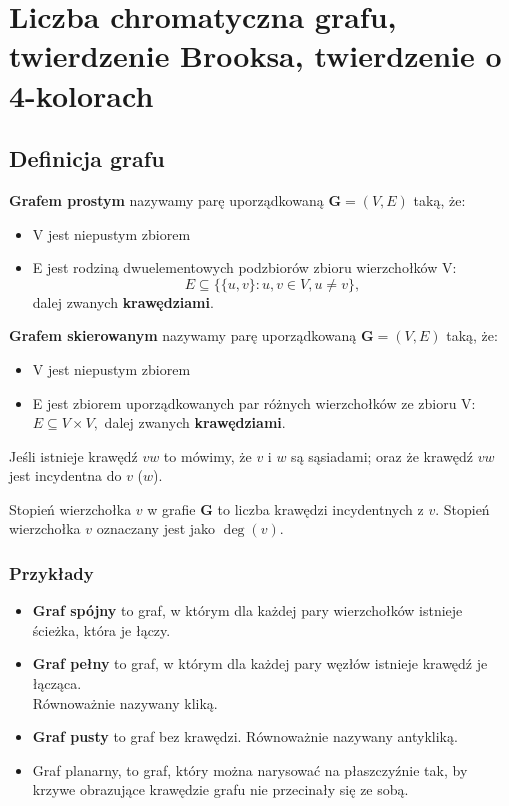\chapter{Liczba chromatyczna grafu, twierdzenie Brooksa, twierdzenie o 4-kolorach}		
\section{Definicja grafu}
	 \begin{df}
	 	\textbf{Grafem prostym} nazywamy parę uporządkowaną $\mathbf{G} = (V,E)$ taką, że:
	 	\begin{itemize}
	 		\item V jest niepustym zbiorem
	 		\item E jest rodziną dwuelementowych podzbiorów zbioru wierzchołków V:
	 		$$E\subseteq \{ \{u,v\} : u,v \in V,u \neq v\},$$
	 		dalej zwanych \textbf{krawędziami}.
	 	\end{itemize}
	 \end{df}
	 \begin{df}
	 	\textbf{Grafem skierowanym} nazywamy parę uporządkowaną $\mathbf{G} = (V,E)$ taką, że:
	 	\begin{itemize}
	 		\item V jest niepustym zbiorem
	 		\item E jest zbiorem uporządkowanych par różnych wierzchołków ze zbioru V: $E\subseteq V \times V,$ dalej zwanych \textbf{krawędziami}.
	 	\end{itemize}
	 \end{df}
	 \begin{df}
	 	Jeśli istnieje krawędź $vw$ to mówimy, że $v$ i  $w$ są sąsiadami; oraz że krawędź $vw$ jest incydentna do $v$ ($w$).
	 \end{df}
	 \begin{df}
	 	Stopień wierzchołka $v$ w grafie $\mathbf{G}$ to liczba krawędzi incydentnych z $v$. Stopień wierzchołka  $v$ oznaczany jest jako $\deg(v)$.
	 \end{df}
	 
	 \subsection*{Przykłady}
		\begin{itemize}
			\item \textbf{Graf spójny} to graf, w którym dla każdej pary wierzchołków istnieje ścieżka,
			która je łączy.
			\item \textbf{Graf pełny} to graf, w którym dla każdej pary węzłów istnieje krawędź je łącząca. \\Równoważnie nazywany kliką. 
			\item \textbf{Graf pusty} to graf bez krawędzi. Równoważnie nazywany antykliką.
			\item Graf planarny, to graf, który można narysować na płaszczyźnie tak, by krzywe obrazujące krawędzie
			grafu nie przecinały się ze sobą. 
		\end{itemize}	  

